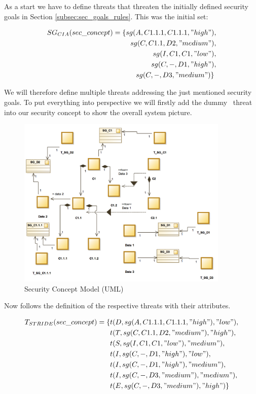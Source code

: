 As a start we have to define threats that threaten the initially defined security goals in Section \ref{subsec:sec_goals_rules}. This was the initial set:

\begin{align*}
SG_{CIA}(sec\_concept) = \{sg(A,C1.1.1,C1.1.1,"high") &, \\ sg(C,C1.1,D2,"medium")&, \\
sg(I,C1,C1,"low")&, \\
sg(C,-,D1,"high")&, \\
sg(C,-,D3,"medium")\} 
\end{align*}

We will therefore define multiple threats addressing the just mentioned security goals. To put everything into perspective we will firstly add the \glqq dummy \grqq \ threat into our security concept to show the overall system picture.

\begin{figure}[H]
\centering
\includegraphics[width=0.9\textwidth]{pictures/threat_transformation}
\caption{Security Concept Model (UML)}
\label{fig:con_c2}
\end{figure}

Now follows the definition of the respective threats with their attributes. 

\begin{align*}
T_{STRIDE}(sec\_concept) = \{&t(D, sg(A,C1.1.1,C1.1.1,"high"), "low"), \\
&t(T, sg(C,C1.1,D2,"medium"), "high"), \\
&t(S, sg(I,C1,C1,"low"), "medium"), \\
&t(I, sg(C,-,D1,"high"), "low"), \\
&t(I, sg(C,-,D1,"high"), "medium"), \\
&t(I, sg(C,-,D3,"medium"), "medium"), \\
&t(E, sg(C,-,D3,"medium"), "high")
\} 
\end{align*}

